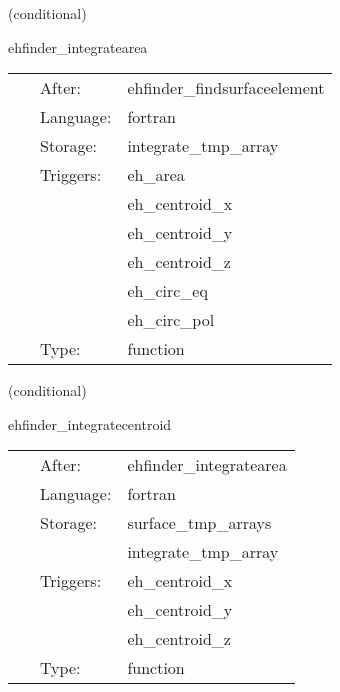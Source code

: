 \vspace{5mm}

   (conditional) 

\hspace{5mm} ehfinder\_integratearea 

\hspace{5mm}{\it calculate area integrals } 


\hspace{5mm}

 \begin{tabular*}{160mm}{cll} 
~ & After:  & ehfinder\_findsurfaceelement \\ 
~ & Language:  & fortran \\ 
~ & Storage:  & integrate\_tmp\_array \\ 
~ & Triggers:  & eh\_area \\ 
~& ~ &eh\_centroid\_x\\ 
~& ~ &eh\_centroid\_y\\ 
~& ~ &eh\_centroid\_z\\ 
~& ~ &eh\_circ\_eq\\ 
~& ~ &eh\_circ\_pol\\ 
~ & Type:  & function \\ 
\end{tabular*} 


\vspace{5mm}

   (conditional) 

\hspace{5mm} ehfinder\_integratecentroid 

\hspace{5mm}{\it calculate centroid integrals } 


\hspace{5mm}

 \begin{tabular*}{160mm}{cll} 
~ & After:  & ehfinder\_integratearea \\ 
~ & Language:  & fortran \\ 
~ & Storage:  & surface\_tmp\_arrays \\ 
~& ~ &integrate\_tmp\_array\\ 
~ & Triggers:  & eh\_centroid\_x \\ 
~& ~ &eh\_centroid\_y\\ 
~& ~ &eh\_centroid\_z\\ 
~ & Type:  & function \\ 
\end{tabular*} 



